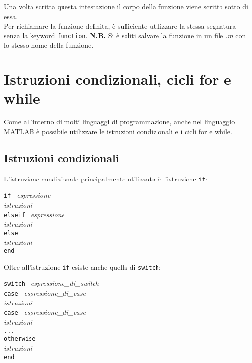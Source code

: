 \documentclass[12pt,a4paper,oneside]{book}
\begin{document}
Una volta scritta questa intestazione il corpo della funzione viene scritto sotto di essa. \\
Per richiamare la funzione definita, è sufficiente utilizzare la stessa segnatura senza la keyword \texttt{function}. \break \break
\textbf{N.B.} Si è soliti salvare la funzione in un file \textit{.m} con lo stesso nome della funzione.


\newpage

\chapter{Istruzioni condizionali, cicli for e while}
Come all'interno di molti linguaggi di programmazione, anche nel linguaggio MATLAB è possibile utilizzare le istruzioni condizionali e i cicli for e while.

\section{Istruzioni condizionali}
L'istruzione condizionale principalmente utilizzata è l'istruzione \texttt{if}: \break

\begin{center}
\texttt{if } \textit{espressione} \\ 
\hspace{1.5cm}\textit{istruzioni}  \\
\hspace{1cm}\texttt{elseif } \textit{espressione} \\ 
\hspace{1.4cm}\textit{istruzioni}  \\
\hspace{-1.8cm}\texttt{else} \\ 
\hspace{1.4cm}\textit{istruzioni}  \\
\hspace{-2cm}\texttt{end}
\end{center}

Oltre all'istruzione  \texttt{if} esiste anche quella di \texttt{switch}:

\begin{center}
\texttt{switch } \textit{espressione\_di\_switch} \\ 
\hspace{1cm}\texttt{case } \textit{espressione\_di\_case} \\ 
\hspace{1.4cm}\textit{istruzioni}  \\
\hspace{1cm}\texttt{case } \textit{espressione\_di\_case} \\ 
\hspace{1.4cm}\textit{istruzioni}  \\
\hspace{2cm} \texttt{...} \\
\hspace{-2cm}\texttt{otherwise } \\ 
\hspace{1.4cm}\textit{istruzioni}  \\
\hspace{-5cm}\texttt{end}
\end{center}
\end{document}
